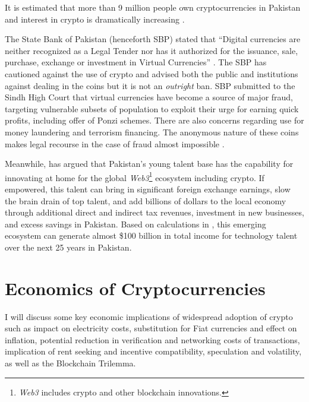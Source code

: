 \documentclass[12pt]{article}
\newcommand{\1}{\mathbbm 1}
\begin{document}
			
			
			
		
	It is estimated that more than 9 million people own cryptocurrencies in Pakistan and interest in crypto is dramatically increasing \cite{tripleA2022}.
			
			
			
		The State Bank of Pakistan (henceforth SBP) stated that ``Digital currencies are neither recognized as a Legal Tender nor has it authorized for the issuance, sale, purchase, exchange or investment in Virtual Currencies'' \cite{khurshid2020}. The SBP has cautioned against the use of crypto and advised both the public and institutions against dealing in the coins but it is not an \textit{outright} ban. SBP submitted to the Sindh High Court that virtual currencies have become a source of major fraud, targeting vulnerable subsets of population to exploit their urge for earning quick profits, including offer of Ponzi schemes. There are also concerns regarding use for money laundering and terrorism financing. The anonymous nature of these coins makes legal recourse in the case of fraud almost impossible \cite{khurshid2020}.
		
		 Meanwhile, \cite{younus2022} has argued that Pakistan's young talent base has the capability for innovating at home for the global \textit{Web3}\footnote{\textit{Web3} includes crypto and other blockchain innovations.} ecosystem including crypto. If empowered, this talent can bring in significant foreign exchange earnings, slow the brain drain of top talent, and add billions of dollars to the local economy through additional direct and indirect tax revenues, investment in new businesses, and excess savings in Pakistan. Based on calculations in \cite{younus2022}, this emerging ecosystem can generate almost \$100 billion in total income for technology talent over the next 25 years in Pakistan.
		 
			 
			 
		
		\section{Economics of Cryptocurrencies}
		
		
		I will discuss some key economic implications of widespread adoption of crypto such as impact on electricity costs, substitution for Fiat currencies and effect on inflation, potential reduction in verification and networking costs of transactions, implication of rent seeking and incentive compatibility, speculation and volatility, as well as the Blockchain Trilemma.
		
\end{document}
